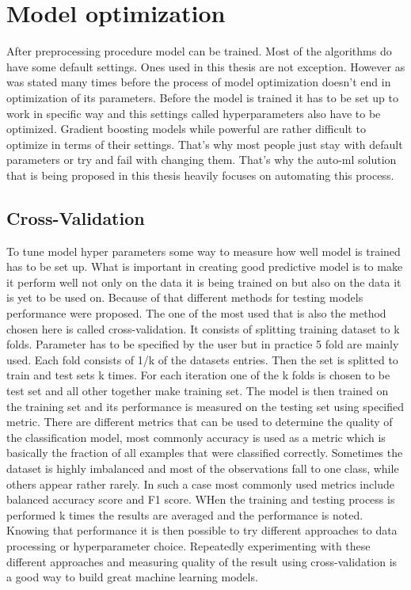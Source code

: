 \documentclass[a4paper,twoside,12pt]{book}
\begin{document}
\section{Model optimization}

After preprocessing procedure model can be trained. Most of the algorithms do have some default settings. Ones used in this thesis are not exception. However as was stated many times before the process of model optimization doesn't end in optimization of its parameters. Before the model is trained it has to be set up to work in specific way and this settings called hyperparameters also have to be optimized. Gradient boosting models while powerful are rather difficult to optimize in terms of their settings. That's why most people just stay with default parameters or try and fail with changing them.
That's why the auto-ml solution that is being proposed in this thesis heavily focuses on automating this process.

\subsection{Cross-Validation}

To tune model hyper parameters some way to measure how well model is trained has to be set up. What is important in creating good predictive model is to make it perform well not only on the data it is being trained on but also on the data it is yet to be used on.
Because of that different methods for testing models performance were proposed. The one of the most used that is also the method chosen here is called cross-validation.
It consists of splitting training dataset to k folds. Parameter has to be specified by the user but in practice 5 fold are mainly used. Each fold consists of 1/k of the datasets entries. Then the set is splitted to train and test sets k times. For each iteration one of the k folds is chosen to be test set and all other together make training set. 
The model is then trained on the training set and its performance is measured on the testing set using specified metric.
There are different metrics that can be used to determine the quality of the classification model, most commonly accuracy is used as a metric which is basically the fraction of all examples that were classified correctly.
Sometimes the dataset is highly imbalanced and most of the observations fall to one class, while others appear rather rarely. In such a case most commonly used metrics include balanced accuracy score and F1 score.
WHen the training and testing process is performed k times the results are averaged and the performance is noted.
Knowing that performance it is then possible to try different approaches to data processing or hyperparameter choice. Repeatedly experimenting with these different approaches and measuring quality of the result using cross-validation is a good way to build great machine learning models.
\end{document}

